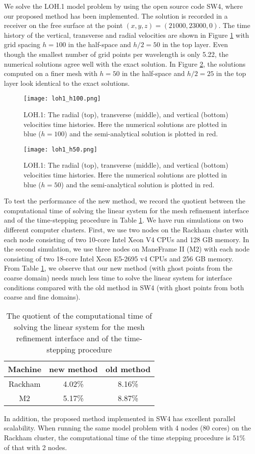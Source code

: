 We solve the LOH.1 model problem by using the open source code SW4, where our proposed method has been implemented. The solution is recorded in a receiver on the free surface at the point $(x, y, z) = (21000, 23000, 0)$. The time history of the vertical, transverse and radial velocities are shown in Figure \ref{loh1_100} with grid spacing $h = 100$ in the half-space and $h/2 = 50$ in the top layer. Even though the smallest number of grid points per wavelength is only 5.22, the numerical solutions agree well with the exact solution. In Figure \ref{loh1_50}, the solutions computed on a finer mesh with $h = 50$ in the half-space and $h/2 = 25$ in the top layer look identical to the exact solutions.
\begin{figure}[htbp]
	\centering
	\texttt{[image: loh1\_h100.png]}
	\caption{LOH.1: The radial (top), transverse (middle), and vertical (bottom) velocities time histories. Here the numerical solutions are plotted in blue ($h = 100$) and the semi-analytical solution is plotted in red.}\label{loh1_100}
\end{figure}

\begin{figure}[htbp]
	\centering
	\texttt{[image: loh1\_h50.png]}
	\caption{LOH.1: The radial (top), transverse (middle), and vertical (bottom) velocities time histories. Here the numerical solutions are plotted in blue ($h = 50$) and the semi-analytical solution is plotted in red.}\label{loh1_50}
\end{figure}

To test the performance of the new method, we record the quotient between the computational time of solving the linear system for the mesh refinement interface and of the time-stepping procedure in Table \ref{time}. We have run simulations on two different computer clusters. First, we use two nodes on the Rackham cluster with each node consisting of two 10-core Intel Xeon V4 CPUs and 128 GB memory. In the second simulation, we use three nodes on ManeFrame II (M2) with each node consisting of two 18-core Intel Xeon E5-2695 v4 CPUs and 256 GB memory. From Table \ref{time}, we observe that our new method (with ghost points from the coarse domain) needs much less time to solve the linear system for interface conditions compared with the old method in SW4 (with ghost points from both coarse and fine domains). 

\begin{table}[htbp]
	\begin{center}
		\begin{tabular}{|c|c|c|}
			\hline
			Machine   & new method & old method \\
			\hline
			Rackham & 4.02\% &  8.16\%\\
			\hline
			M2 &5.17\% & 8.87\%\\
			\hline 
		\end{tabular}
	\end{center}
		\caption{The quotient of the computational time of solving the linear system for the mesh refinement interface and of the time-stepping procedure}\label{time}
\end{table} 

In addition, the proposed method implemented in SW4 has excellent parallel scalability. When running the same model problem with 4 nodes (80 cores) on the Rackham cluster, the computational time of the time stepping procedure is $51\%$ of that with 2 nodes. 
